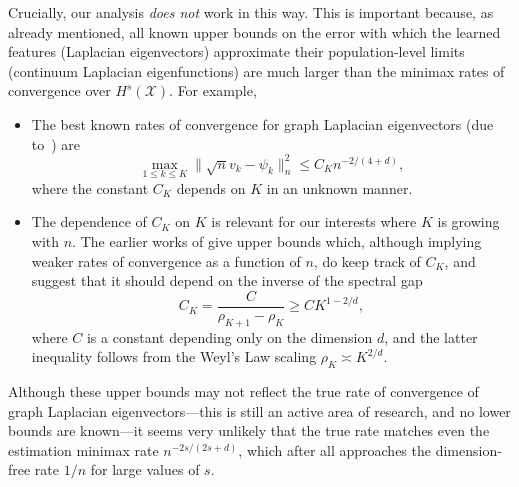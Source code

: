 \documentclass{article}
\theoremstyle{definition}
\newcommand{\mc}[1]{\mathcal{#1}}
\newcommand{\1}{\mathbf{1}}
\begin{document}
	Crucially, our analysis \emph{does not} work in this way. This is important because, as already mentioned, all known upper bounds on the error with which the learned features (Laplacian eigenvectors) approximate their population-level limits (continuum Laplacian eigenfunctions) are much larger than the minimax rates of convergence over $H^s(\mc{X})$. For example,
	\begin{itemize}
		\item The best known rates of convergence for graph Laplacian eigenvectors (due to~\cite{cheng2021}) are
		\begin{equation}
		\label{eqn:eigenvector_convergence}
		\max_{1 \leq k \leq K}\|\sqrt{n}v_k - \psi_k\|_n^2 \leq C_{K} n^{-2/(4 + d)},
		\end{equation}
		where the constant $C_K$ depends on $K$ in an unknown manner.
		\item The dependence of $C_K$ on $K$ is relevant for our interests where $K$ is growing with $n$. The earlier works of \cite{burago2014,trillos2019} give upper bounds which, although implying weaker rates of convergence as a function of $n$, do keep track of $C_K$, and suggest that it should depend on the inverse of the spectral gap 
		\begin{equation}
		\label{eqn:spectral_gap}
		C_K = \frac{C}{\rho_{K + 1} - \rho_K} \geq C K^{1 - 2/d},
		\end{equation}
		where $C$ is a constant depending only on the dimension $d$, and the latter inequality follows from the Weyl's Law scaling $\rho_K \asymp K^{2/d}$.
	\end{itemize}
	Although these upper bounds may not reflect the true rate of convergence of graph Laplacian eigenvectors---this is still an active area of research, and no lower bounds are known---it seems very unlikely that the true rate matches even the estimation minimax rate $n^{-2s/(2s + d)}$, which after all approaches the dimension-free rate $1/n$ for large values of $s$. 
	
\end{document}
